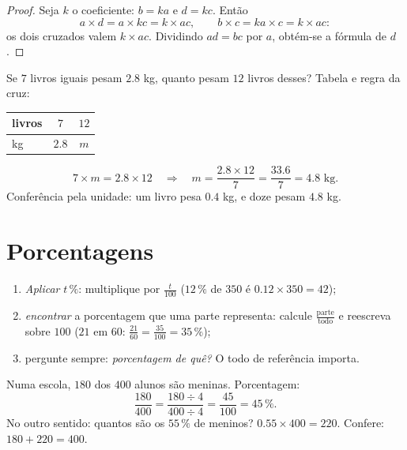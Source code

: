 \begin{proof}
Seja $k$ o coeficiente: $b = ka$ e $d = kc$. Então
\[
a \times d = a \times kc = k \times ac,
\qquad
b \times c = ka \times c = k \times ac :
\]
os dois  cruzados valem $k \times ac$. Dividindo $ad = bc$ por
$a$, obtém-se a fórmula de $d$.
\end{proof}

\begin{example}\label{ex:g7:prop:fourth}
Se $7$ livros iguais pesam $2.8$ kg, quanto pesam $12$ livros desses?
Tabela e regra da cruz:
\begin{center}
\renewcommand{\arraystretch}{1.3}
\begin{tabular}{l|cc}
livros & $7$ & $12$ \\
\hline
kg & $2.8$ & $m$ \\
\end{tabular}
\end{center}
\[
7 \times m = 2.8 \times 12
\quad\Longrightarrow\quad
m = \frac{2.8 \times 12}{7} = \frac{33.6}{7} = 4.8 \text{ kg}.
\]
Conferência pela unidade: um livro pesa $0.4$ kg, e doze pesam
$4.8$ kg.
\end{example}

\section{Porcentagens}

\begin{method}\label{met:g7:prop:percent}
\begin{enumerate}
  \item \emph{Aplicar} $t\,\%$: multiplique por $\frac{t}{100}$
        ($12\,\%$ de $350$ é $0.12 \times 350 = 42$);
  \item \emph{encontrar} a porcentagem que uma parte representa:
        calcule $\frac{\text{parte}}{\text{todo}}$ e reescreva sobre
        $100$ ($21$ em $60$: $\frac{21}{60} = \frac{35}{100} =
        35\,\%$);
  \item pergunte sempre: \emph{porcentagem de quê?} O todo de
        referência importa.
\end{enumerate}
\end{method}

\begin{example}\label{ex:g7:prop:percent}
Numa escola, $180$ dos $400$ alunos são meninas. Porcentagem:
\[
\frac{180}{400} = \frac{180 \div 4}{400 \div 4} = \frac{45}{100}
= 45\,\% .
\]
No outro sentido: quantos são os $55\,\%$ de meninos?
$0.55 \times 400 = 220$. Confere: $180 + 220 = 400$.
\end{example}

